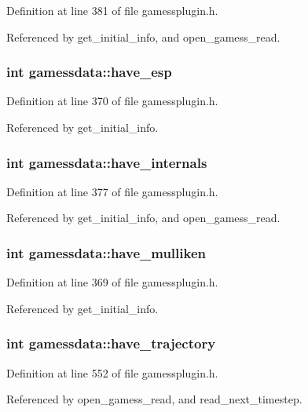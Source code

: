 Definition at line 381 of file gamessplugin.h.

Referenced by get\_\-initial\_\-info, and open\_\-gamess\_\-read.
\subsubsection{\setlength{\rightskip}{0pt plus 5cm}int gamessdata::have\_\-esp}\label{structgamessdata_m36}




Definition at line 370 of file gamessplugin.h.

Referenced by get\_\-initial\_\-info.
\subsubsection{\setlength{\rightskip}{0pt plus 5cm}int gamessdata::have\_\-internals}\label{structgamessdata_m37}




Definition at line 377 of file gamessplugin.h.

Referenced by get\_\-initial\_\-info, and open\_\-gamess\_\-read.
\subsubsection{\setlength{\rightskip}{0pt plus 5cm}int gamessdata::have\_\-mulliken}\label{structgamessdata_m35}




Definition at line 369 of file gamessplugin.h.

Referenced by get\_\-initial\_\-info.
\subsubsection{\setlength{\rightskip}{0pt plus 5cm}int gamessdata::have\_\-trajectory}\label{structgamessdata_m77}




Definition at line 552 of file gamessplugin.h.

Referenced by open\_\-gamess\_\-read, and read\_\-next\_\-timestep.
